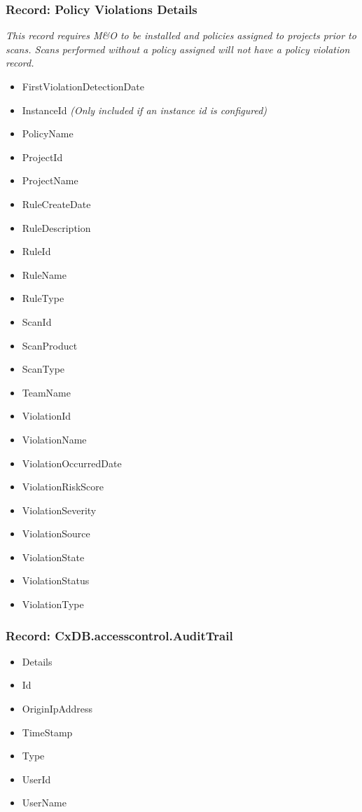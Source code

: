 \subsubsection{Record: Policy Violations Details}
\textit{This record requires M\&O to be installed and policies assigned to projects prior to scans.  Scans performed without a policy assigned will not have a policy
violation record.}

\begin{itemize}
    \item FirstViolationDetectionDate
    \item InstanceId \textit{(Only included if an instance id is configured)}
    \item PolicyName
    \item ProjectId
    \item ProjectName
    \item RuleCreateDate
    \item RuleDescription
    \item RuleId
    \item RuleName
    \item RuleType
    \item ScanId
    \item ScanProduct
    \item ScanType
    \item TeamName
    \item ViolationId
    \item ViolationName
    \item ViolationOccurredDate
    \item ViolationRiskScore
    \item ViolationSeverity
    \item ViolationSource
    \item ViolationState
    \item ViolationStatus
    \item ViolationType
\end{itemize}


\subsubsection{Record: CxDB.accesscontrol.AuditTrail}

\begin{itemize}
    \item Details
    \item Id
    \item OriginIpAddress
    \item TimeStamp
    \item Type
    \item UserId
    \item UserName
\end{itemize}


